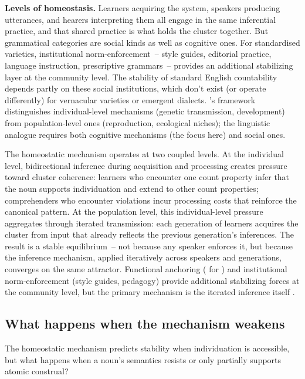 \documentclass[12pt,a4paper]{article}
\begin{document}
\textbf{Levels of homeostasis.} Learners acquiring the system, speakers producing utterances, and hearers interpreting them all engage in the same inferential practice, and that shared practice is what holds the cluster together. But grammatical categories are social kinds as well as cognitive ones. For standardised varieties, institutional norm-enforcement~-- style guides, editorial practice, language instruction, prescriptive grammars~-- provides an additional stabilizing layer at the community level. The stability of standard English countability depends partly on these social institutions, which don't exist (or operate differently) for vernacular varieties or emergent dialects. \textcite{boyd1991}'s framework distinguishes individual-level mechanisms (genetic transmission, development) from population-level ones (reproduction, ecological niches); the linguistic analogue requires both cognitive mechanisms (the focus here) and social ones.

The homeostatic mechanism operates at two coupled levels. At the individual level, bidirectional inference during acquisition and processing creates pressure toward cluster coherence: learners who encounter one count property infer that the noun supports individuation and extend to other count properties; comprehenders who encounter violations incur processing costs that reinforce the canonical pattern. At the population level, this individual-level pressure aggregates through iterated transmission: each generation of learners acquires the cluster from input that already reflects the previous generation's inferences. The result is a stable equilibrium~-- not because any speaker enforces it, but because the inference mechanism, applied iteratively across speakers and generations, converges on the same attractor. Functional anchoring ( for ) and institutional norm-enforcement (style guides, pedagogy) provide additional stabilizing forces at the community level, but the primary mechanism is the iterated inference itself \citep{kirby2008}.

\subsection{What happens when the mechanism weakens}\label{sec:weakening}

The homeostatic mechanism predicts stability when individuation is accessible, but what happens when a noun's semantics resists or only partially supports atomic construal?
\end{document}
